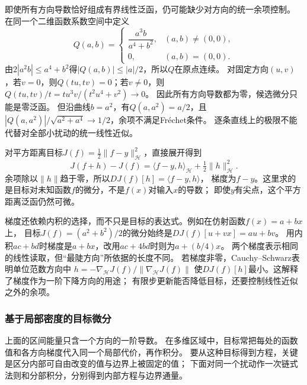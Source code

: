 即使所有方向导数恰好组成有界线性泛函，仍可能缺少对方向的统一余项控制。
在同一个二维函数系数空间中定义
\[
 Q(a,b)=
 \begin{cases}
  \dfrac{a^3b}{a^4+b^2},&(a,b)\neq(0,0),\\
  0,&(a,b)=(0,0).
 \end{cases}
\]
由$2|a^2b|\leq a^4+b^2$得$|Q(a,b)|\leq|a|/2$，所以$Q$在原点连续。
对固定方向$(u,v)$，若$v=0$，则$Q(tu,tv)=0$；若$v\neq0$，则
$Q(tu,tv)/t=t u^3v/(t^2u^4+v^2)\to0$。
因此所有方向导数都为零，候选微分只能是零泛函。
但沿曲线$b=a^2$，有$Q(a,a^2)=a/2$，且
$|Q(a,a^2)|/\sqrt{a^2+a^4}\to1/2$，余项不满足Fréchet条件。
逐条直线上的极限不能代替对全部小扰动的统一线性近似。

对平方距离目标$J(f)=\frac12\lVert f-y\rVert_{\mathcal H}^2$，直接展开得到
\[
 J(f+h)-J(f)
 =\langle f-y,h\rangle_{\mathcal H}+\tfrac12\lVert h\rVert_{\mathcal H}^2.
\]
余项除以$\lVert h\rVert$趋于零，所以$DJ(f)[h]=\langle f-y,h\rangle$，
梯度为$f-y$。这里求的是目标对未知函数$f$的微分，不是$f(x)$对输入$x$的导数；
即使$y$有尖点，这个平方距离泛函仍然可微。

梯度还依赖内积的选择，而不只是目标的表达式。例如在仿射函数$f(x)=a+bx$上，
目标$J(f)=(a^2+b^2)/2$的微分始终是$DJ(f)[u+vx]=au+bv$。
用内积$ac+bd$时梯度是$a+bx$，改用$ac+4bd$时则为$a+(b/4)x$。
两个梯度表示相同的线性读取，但“最陡方向”所依据的长度不同。
若梯度非零，Cauchy--Schwarz表明单位范数方向中
$h=-\nabla_{\mathcal H}J(f)/\lVert\nabla_{\mathcal H}J(f)\rVert$
使$DJ(f)[h]$最小。这解释了梯度作为一阶下降方向的用途；
有限步更新能否降低目标，还要控制线性近似之外的余项。

\subsubsection{基于局部密度的目标微分}
\label{sec:functional-local-density-variation}

上面的区间能量只含一个方向的一阶导数。
在多维区域中，目标常把每处的函数值和各方向梯度代入同一个局部代价，再作积分。
要从这种目标得到方程，关键是区分内部可自由改变的值与边界上被固定的值；
下面对同一个扰动作一次链式法则和分部积分，分别得到内部方程与边界通量。

